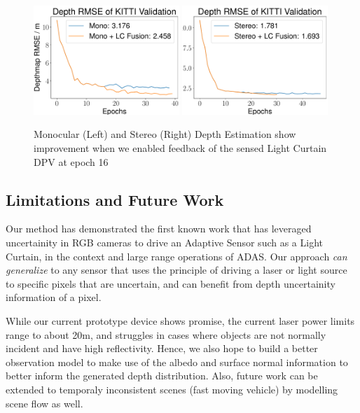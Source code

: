 \begin{figure}[h]
  \centering
  \begin{minipage}{0.5\textwidth}
      \centering
      \includegraphics[width=0.49\textwidth]{figures/Figure_10.pdf}
      \includegraphics[width=0.49\textwidth]{figures/Figure_11.pdf}
  \end{minipage}\hfill
  \centering
  \caption{Monocular (Left) and Stereo (Right) Depth Estimation show improvement when we enabled feedback of the sensed Light Curtain DPV at epoch 16}
  \label{fig:lfusion} 
\end{figure}

\subsection{Limitations and Future Work}

Our method has demonstrated the first known work that has leveraged uncertainity in RGB cameras to drive an Adaptive Sensor such as a Light Curtain, in the context and large range operations of ADAS. Our approach \textit{can generalize} to any sensor that uses the principle of driving a laser or light source to specific pixels that are uncertain, and can benefit from depth uncertainity information of a pixel. 

While our current prototype device shows promise, the current laser power limits range to about 20m, and struggles in cases where objects are not normally incident and have high reflectivity. Hence, we also hope to build a better observation model to make use of the albedo and surface normal information to better inform the generated depth distribution. Also, future work can be extended to temporaly inconsistent scenes (fast moving vehicle) by modelling scene flow as well.

